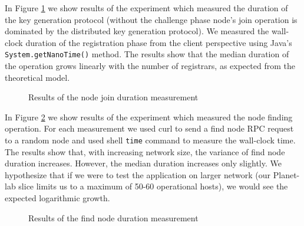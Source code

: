 In Figure \ref{fig:reg_test} we show results of the experiment which measured
the duration of the key generation protocol (without the challenge phase node's
join operation is dominated by the distributed key generation protocol).
We measured the wall-clock duration of the registration phase from the client
perspective using Java's \texttt{System.getNanoTime()} method.
The results show that the median duration of the operation grows linearly with
the number of registrars, as expected from the theoretical model.

\begin{figure}[tbp]
  \centering
\resizebox{\columnwidth}{!}{}
\caption{Results of the node join duration measurement}
\label{fig:reg_test}
\end{figure}

In Figure \ref{fig:fin_test} we show results of the experiment which measured
the node finding operation.
For each measurement we used curl to send a find node RPC request to a
random node and used shell \texttt{time} command to measure the wall-clock time.
The results show that, with increasing network size, the variance of find
node duration increases.
However, the median duration increases only slightly.
We hypothesize that if we were to test the application on larger network (our
Planet-lab slice limits us to a maximum of 50-60 operational hosts), we would
see the expected logarithmic growth.

\begin{figure}[tbp]
  \centering
\resizebox{\columnwidth}{!}{}
\caption{Results of the find node duration measurement}
\label{fig:fin_test}
\end{figure}
